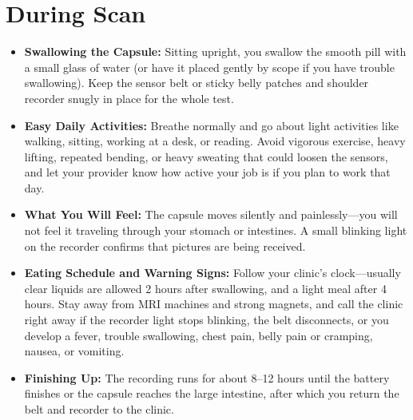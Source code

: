 \section{During Scan}
\begin{itemize}
    \item \textbf{Swallowing the Capsule:} Sitting upright, you swallow the smooth pill with a small glass of water (or have it placed gently by scope if you have trouble swallowing). Keep the sensor belt or sticky belly patches and shoulder recorder snugly in place for the whole test.
    \item \textbf{Easy Daily Activities:} Breathe normally and go about light activities like walking, sitting, working at a desk, or reading. Avoid vigorous exercise, heavy lifting, repeated bending, or heavy sweating that could loosen the sensors, and let your provider know how active your job is if you plan to work that day.
    \item \textbf{What You Will Feel:} The capsule moves silently and painlessly---you will not feel it traveling through your stomach or intestines. A small blinking light on the recorder confirms that pictures are being received.
    \item \textbf{Eating Schedule and Warning Signs:} Follow your clinic's clock---usually clear liquids are allowed 2 hours after swallowing, and a light meal after 4 hours. Stay away from MRI machines and strong magnets, and call the clinic right away if the recorder light stops blinking, the belt disconnects, or you develop a fever, trouble swallowing, chest pain, belly pain or cramping, nausea, or vomiting.
    \item \textbf{Finishing Up:} The recording runs for about 8--12 hours until the battery finishes or the capsule reaches the large intestine, after which you return the belt and recorder to the clinic.
\end{itemize}

